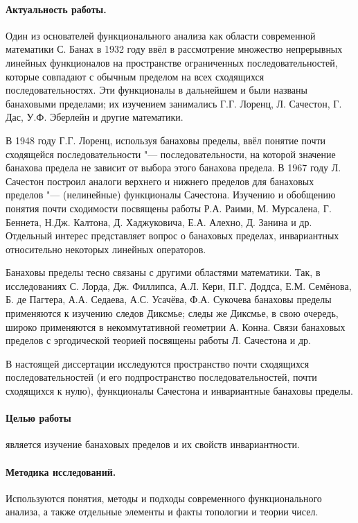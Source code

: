 \paragraph{Актуальность работы.}

Один из основателей функционального анализа как области современной математики С. Банах
в 1932 году ввёл в рассмотрение множество непрерывных линейных функционалов на пространстве ограниченных последовательностей,
которые совпадают с обычным пределом на всех сходящихся последовательностях.
Эти функционалы в дальнейшем и были названы банаховыми пределами;
их изучением занимались Г.Г. Лоренц, Л. Сачестон, Г. Дас, У.Ф. Эберлейн и другие математики.

В 1948 году Г.Г. Лоренц, используя банаховы пределы, ввёл понятие почти сходящейся последовательности "---
последовательности, на которой значение банахова предела не зависит от выбора этого банахова предела.
В 1967 году Л. Сачестон построил аналоги верхнего и нижнего пределов для банаховых пределов "---
(нелинейные) функционалы Сачестона.
Изучению и обобщению понятия почти сходимости посвящены работы
Р.А. Раими, М. Мурсалена, Г. Беннета, Н.Дж. Калтона, Д. Хаджуковича, Е.А. Алехно, Д. Занина и др.
Отдельный интерес представляет вопрос о банаховых пределах, инвариантных относительно некоторых линейных операторов.

Банаховы пределы тесно связаны с другими областями математики.
Так, в исследованиях С. Лорда, Дж. Филлипса, А.Л. Кери, П.Г. Доддса, Е.М. Семёнова, Б. де Пагтера,
А.А. Седаева, А.С. Усачёва, Ф.А. Сукочева банаховы пределы применяются к изучению следов Диксмье;
следы же Диксмье, в свою очередь, широко применяются в некоммутативной геометрии А. Конна.
Связи банаховых пределов с эргодической теорией посвящены работы Л. Сачестона и др.

В настоящей диссертации исследуются пространство почти сходящихся последовательностей
(и его подпространство последовательностей, почти сходящихся к нулю),
функционалы Сачестона и инвариантные банаховы пределы.

\paragraph{Целью работы}
является изучение банаховых пределов и их свойств инвариантности.

\paragraph{Методика исследований.}
Используются понятия, методы и подходы современного функционального анализа,
а также отдельные элементы и факты топологии и теории чисел.


